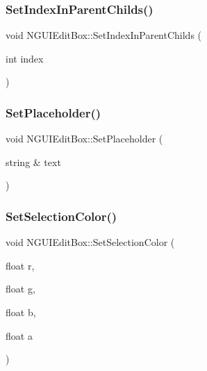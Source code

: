 \hypertarget{class_n_g_u_i_edit_box_adc6dfcf7ba83b8a7025f3dbefaeeaab8}{}\label{class_n_g_u_i_edit_box_adc6dfcf7ba83b8a7025f3dbefaeeaab8} 
\subsubsection{\texorpdfstring{Set\+Index\+In\+Parent\+Childs()}{SetIndexInParentChilds()}}
{\footnotesize\ttfamily void N\+G\+U\+I\+Edit\+Box\+::\+Set\+Index\+In\+Parent\+Childs (\begin{DoxyParamCaption}\item[{int}]{index }\end{DoxyParamCaption})}

\hypertarget{class_n_g_u_i_edit_box_a836d8d8d179c9e692717df35738210ef}{}\label{class_n_g_u_i_edit_box_a836d8d8d179c9e692717df35738210ef} 
\subsubsection{\texorpdfstring{Set\+Placeholder()}{SetPlaceholder()}}
{\footnotesize\ttfamily void N\+G\+U\+I\+Edit\+Box\+::\+Set\+Placeholder (\begin{DoxyParamCaption}\item[{string \&}]{text }\end{DoxyParamCaption})}

\hypertarget{class_n_g_u_i_edit_box_a34b1b792f4692e22c137af73401458c6}{}\label{class_n_g_u_i_edit_box_a34b1b792f4692e22c137af73401458c6} 
\subsubsection{\texorpdfstring{Set\+Selection\+Color()}{SetSelectionColor()}}
{\footnotesize\ttfamily void N\+G\+U\+I\+Edit\+Box\+::\+Set\+Selection\+Color (\begin{DoxyParamCaption}\item[{float}]{r,  }\item[{float}]{g,  }\item[{float}]{b,  }\item[{float}]{a }\end{DoxyParamCaption})}

